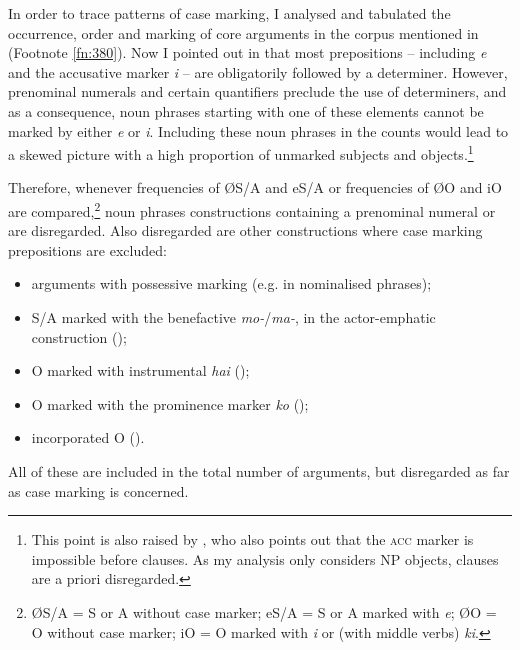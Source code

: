 In order to trace patterns of case marking, I analysed and tabulated the occurrence, order and marking of core arguments in the corpus mentioned in  (Footnote \ref{fn:380}). Now I pointed out in  that most prepositions – including  \textit{e} and the accusative marker \textit{i} – are obligatorily followed by a determiner. However, prenominal numerals and certain quantifiers preclude the use of determiners, and as a consequence, noun phrases starting with one of these elements cannot be marked by either \textit{e} or \textit{i}. Including these noun phrases in the counts would lead to a skewed picture with a high proportion of unmarked subjects and objects.\footnote{\label{fn:388}This point is also raised by \citet[43]{WeberN2003}, who also points out that the \textsc{acc} marker is impossible before  clauses. As my analysis only considers NP objects,  clauses are a priori disregarded.}

Therefore, whenever frequencies of ØS/A and eS/A or frequencies of ØO and iO are compared,\footnote{\label{fn:389}ØS/A = S or A without case marker; eS/A = S or A marked with \textit{e}; ØO = O without case marker; iO = O marked with \textit{i} or (with middle verbs) \textit{ki}.} noun phrases constructions containing a prenominal numeral or  are disregarded. Also disregarded are other constructions where case marking prepositions are excluded:

\begin{itemize}
\item 
arguments with possessive marking (e.g. in nominalised phrases);

\item 
S/A marked with the benefactive \textit{mo-}/\textit{ma-}, in the  actor-emphatic construction ();

\item 
O marked with instrumental \textit{hai} ();

\item 
O marked with the prominence marker \textit{ko} ();

\item 
incorporated O ().

\end{itemize}

All of these are included in the total number of arguments, but disregarded as far as case marking is concerned.
